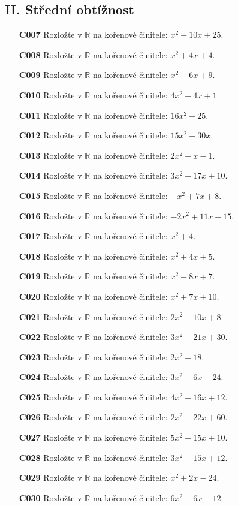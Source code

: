 \documentclass[11pt,a4paper]{article}
\begin{document}
\subsection*{II. Střední obtížnost}
\begin{enumerate}[label={},itemsep=5pt]
\item[\textbf{C007}] Rozložte v $\mathbb R$ na kořenové činitele: $x^{2} - 10x + 25$. 
\item[\textbf{C008}] Rozložte v $\mathbb R$ na kořenové činitele: $x^{2} + 4x + 4$. 
\item[\textbf{C009}] Rozložte v $\mathbb R$ na kořenové činitele: $x^{2} - 6x + 9$. 
\item[\textbf{C010}] Rozložte v $\mathbb R$ na kořenové činitele: $4x^{2} + 4x + 1$. 
\item[\textbf{C011}] Rozložte v $\mathbb R$ na kořenové činitele: $16x^{2} - 25$. 
\item[\textbf{C012}] Rozložte v $\mathbb R$ na kořenové činitele: $15x^{2} - 30x$. 
\item[\textbf{C013}] Rozložte v $\mathbb R$ na kořenové činitele: $2x^{2} + x - 1$. 
\item[\textbf{C014}] Rozložte v $\mathbb R$ na kořenové činitele: $3x^{2} - 17x + 10$. 
\item[\textbf{C015}] Rozložte v $\mathbb R$ na kořenové činitele: $- x^{2} + 7x + 8$. 
\item[\textbf{C016}] Rozložte v $\mathbb R$ na kořenové činitele: $- 2x^{2} + 11x - 15$. 
\item[\textbf{C017}] Rozložte v $\mathbb R$ na kořenové činitele: $x^{2} + 4$. 
\item[\textbf{C018}] Rozložte v $\mathbb R$ na kořenové činitele: $x^{2} + 4x + 5$. 
\item[\textbf{C019}] Rozložte v $\mathbb R$ na kořenové činitele: $x^{2} - 8x + 7$.
\item[\textbf{C020}] Rozložte v $\mathbb R$ na kořenové činitele: $x^{2} + 7x + 10$.
\item[\textbf{C021}] Rozložte v $\mathbb R$ na kořenové činitele: $2x^{2} - 10x + 8$.
\item[\textbf{C022}] Rozložte v $\mathbb R$ na kořenové činitele: $3x^{2} - 21x + 30$.
\item[\textbf{C023}] Rozložte v $\mathbb R$ na kořenové činitele: $2x^{2} - 18$.
\item[\textbf{C024}] Rozložte v $\mathbb R$ na kořenové činitele: $3x^{2} - 6x - 24$.
\item[\textbf{C025}] Rozložte v $\mathbb R$ na kořenové činitele: $4x^{2} - 16x + 12$.
\item[\textbf{C026}] Rozložte v $\mathbb R$ na kořenové činitele: $2x^{2} - 22x + 60$.
\item[\textbf{C027}] Rozložte v $\mathbb R$ na kořenové činitele: $5x^{2} - 15x + 10$.
\item[\textbf{C028}] Rozložte v $\mathbb R$ na kořenové činitele: $3x^{2} + 15x + 12$.
\item[\textbf{C029}] Rozložte v $\mathbb R$ na kořenové činitele: $x^{2} + 2x - 24$.
\item[\textbf{C030}] Rozložte v $\mathbb R$ na kořenové činitele: $6x^{2} - 6x - 12$.
\end{enumerate}
\end{document}
